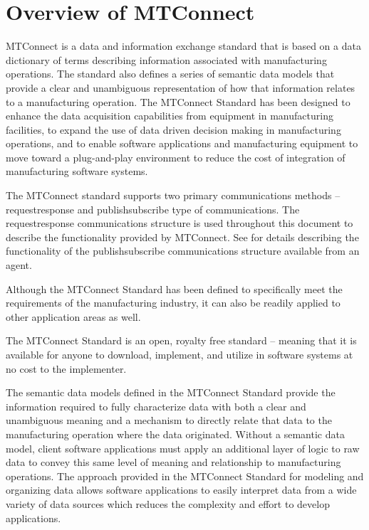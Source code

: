 \section{Overview of MTConnect}

MTConnect is a data and information exchange standard that is based on a \gls{data dictionary} of terms describing information associated with manufacturing operations.  The standard also defines a series of \glspl{semantic data model} that provide a clear and unambiguous representation of how that information relates to a manufacturing operation.  The MTConnect Standard has been designed to enhance the data acquisition capabilities from equipment in manufacturing facilities, to expand the use of data driven decision making in manufacturing operations, and to enable software applications and manufacturing equipment to move toward a plug-and-play environment to reduce the cost of integration of manufacturing software systems.

The MTConnect standard supports two primary communications methods – \gls{requestresponse} and \gls{publishsubscribe} type of communications.  The \gls{requestresponse} communications structure is used throughout this document to describe the functionality provided by MTConnect.  See  for details describing the functionality of the \gls{publishsubscribe} communications structure available from an \gls{agent}. 

Although the MTConnect Standard has been defined to specifically meet the requirements of the manufacturing industry, it can also be readily applied to other application areas as well.

The MTConnect Standard is an open, royalty free standard – meaning that it is available for anyone to download, implement, and utilize in software systems at no cost to the implementer.

The \glspl{semantic data model} defined in the MTConnect Standard provide the information required to fully characterize data with both a clear and unambiguous meaning and a mechanism to directly relate that data to the manufacturing operation where the data originated.  Without a \gls{semantic data model}, client software applications must apply an additional layer of logic to raw data to convey this same level of meaning and relationship to manufacturing operations.  The approach provided in the MTConnect Standard for modeling and organizing data allows software applications to easily interpret data from a wide variety of data sources which reduces the complexity and effort to develop applications.

